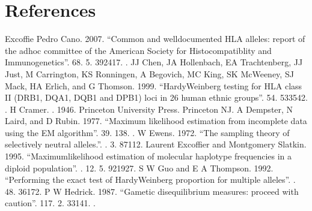 \documentclass[letterpaper,10pt,english,openany,oneside]{sphinxmanual}
\begin{document}
\chapter{References}
\label{\detokenize{docs/biblio:references}}\label{\detokenize{docs/biblio:refs}}\label{\detokenize{docs/biblio::doc}}
\begin{sphinxthebibliography}{Excoffie}
\sphinxAtStartPar
Pedro Cano. 2007. “Common and well\sphinxhyphen{}documented HLA
alleles: report of the ad\sphinxhyphen{}hoc committee of the American Society
for Histocompatiblity and Immunogenetics”. 68. 5. 392\sphinxhyphen{}417.
.
\sphinxAtStartPar
JJ Chen, JA Hollenbach, EA Trachtenberg, JJ Just,
M Carrington, KS Ronningen, A Begovich, MC King, SK McWeeney, SJ
Mack, HA Erlich, and G Thomson. 1999. “Hardy\sphinxhyphen{}Weinberg testing for
HLA class II (DRB1, DQA1, DQB1 and DPB1) loci in 26 human ethnic
groups”. 54. 533\sphinxhyphen{}542. .
\sphinxAtStartPar
H Cramer. .
1946. Princeton University Press. Princeton NJ.
\sphinxAtStartPar
A Dempster, N Laird, and D Rubin. 1977. “Maximum
likelihood estimation from incomplete data using the EM
algorithm”. 39. 1\sphinxhyphen{}38. .
\sphinxAtStartPar
W Ewens. 1972. “The sampling theory of selectively
neutral alleles.”. . 3. 87\sphinxhyphen{}112.
\sphinxAtStartPar
Laurent Excoffier and Montgomery Slatkin.
1995. “Maximum\sphinxhyphen{}likelihood estimation of molecular haplotype
frequencies in a diploid population”. . 12. 5. 921\sphinxhyphen{}927.
\sphinxAtStartPar
S W Guo and E A Thompson. 1992. “Performing
the exact test of Hardy\sphinxhyphen{}Weinberg proportion for multiple alleles”.
. 48. 361\sphinxhyphen{}72.
\sphinxAtStartPar
P W Hedrick. 1987. “Gametic disequilibrium
measures: proceed with caution”. 117. 2. 331\sphinxhyphen{}41. .
\sphinxAtStartPar

\end{sphinxthebibliography}
\end{document}
